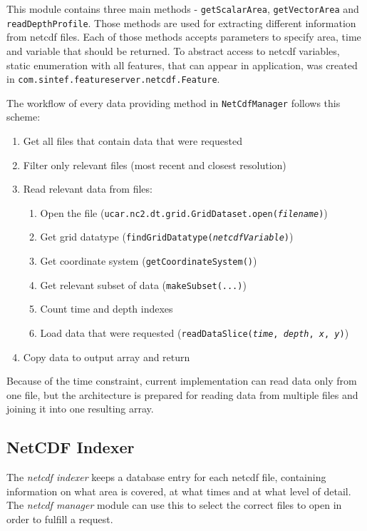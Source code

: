 \documentclass[11pt,a4paper,titlepage,oneside]{report}
\begin{document}
This module contains three main methods - \texttt{getScalarArea}, \texttt{getVectorArea} and \texttt{readDepthProfile}. Those methods are used for extracting different information from \gls{netcdf} files. Each of those methods accepts parameters to specify area, time and variable that should be returned. To abstract access to \gls{netcdf} variables, static enumeration with all features, that can appear in application, was created in \texttt{com.sintef.featureserver.netcdf.Feature}.

The workflow of every data providing method in \texttt{NetCdfManager} follows this scheme:
\begin{enumerate}
    \item Get all files that contain data that were requested
    \item Filter only relevant files (most recent and closest resolution)
    \item Read relevant data from files:
    \begin{enumerate}
        \item Open the file (\texttt{ucar.nc2.dt.grid.GridDataset.open(\textit{filename})})
        \item Get grid datatype (\texttt{findGridDatatype(\textit{netcdfVariable})})
        \item Get coordinate system (\texttt{getCoordinateSystem()})
        \item Get relevant subset of data (\texttt{makeSubset(...)})
        \item Count time and depth indexes
        \item Load data that were requested (\texttt{readDataSlice(\textit{time}, \textit{depth}, \textit{x}, \textit{y})})
    \end{enumerate}
    \item Copy data to output array and return
\end{enumerate}

Because of the time constraint, current implementation can read data only from one file, but the architecture is prepared for reading data from multiple files and joining it into one resulting array.

\subsection{NetCDF Indexer}
The \textit{\gls{netcdf} indexer} keeps a database entry for each \gls{netcdf} file, containing information on what area is covered, at what times and at what level of detail. The \textit{\gls{netcdf} manager} module can use this to select the correct files to open in order to fulfill a request.
\end{document}
